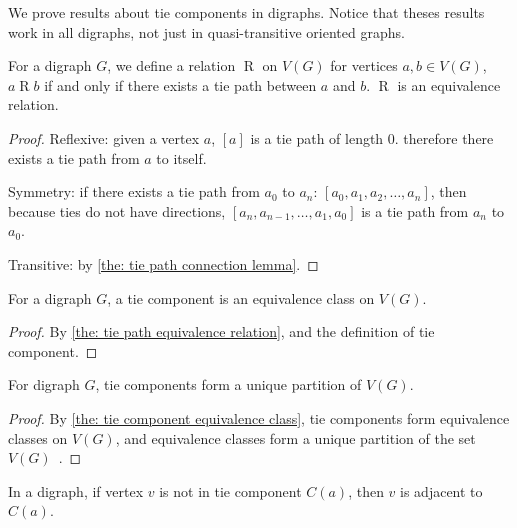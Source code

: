 We prove results about tie components in digraphs.
Notice that theses results work in all digraphs,
not just in quasi-transitive oriented graphs.

\begin{theorem}\label{the: tie path equivalence relation}
  For a digraph \(G\),
  we define a relation \(\mathrel{R}\) on \(V(G)\)
  for vertices \(a, b \in V(G)\),
  \(a\mathrel{R}b\) if and only if
  there exists a tie path between \(a\) and \(b\).
  \(\mathrel{R}\) is an equivalence relation.
\end{theorem}

\begin{proof}
  Reflexive: given a vertex \(a\),
  \([a]\) is a tie path of length 0.
  therefore there exists a tie path from \(a\) to itself.

  Symmetry: if there exists a tie path from \(a_0\) to \(a_n\):
  \([a_0, a_1, a_2, \ldots, a_n]\),
  then because ties do not have directions,
  \([a_n, a_{n-1}, \ldots, a_1, a_0]\) is a tie path from
  \(a_n\) to \(a_0\).

  Transitive: by \cref{the: tie path connection lemma}.
\end{proof}

\begin{corollary}\label{the: tie component equivalence class}
  For a digraph \(G\), a tie component is an equivalence class
  on \(V(G)\).
\end{corollary}
\begin{proof}
  By \cref{the: tie path equivalence relation},
  and the definition of tie component.
\end{proof}

\begin{corollary}\label{the: tie components partition unique}
  For digraph \(G\), tie components form a unique
  partition of \(V(G)\).
\end{corollary}

\begin{proof}
  By \cref{the: tie component equivalence class},
  tie components form equivalence classes on \(V(G)\),
  and equivalence classes form a unique partition
  of the set \(V(G)\)~\cite{epp_discrete_2011}.
\end{proof}

\begin{corollary}\label{the: adjacent if not in component}
  In a digraph, if vertex \(v\) is not in tie component \(C(a)\),
  then \(v\) is adjacent to \(C(a)\).
\end{corollary}

